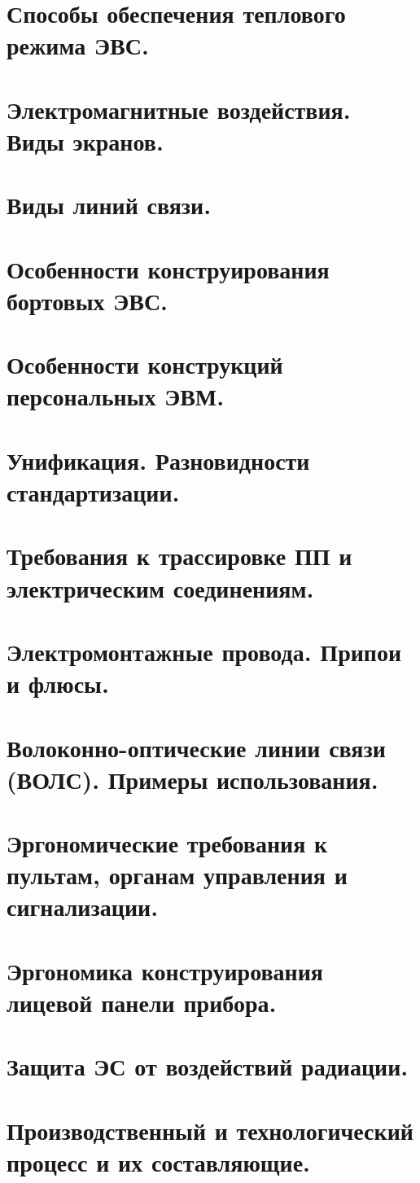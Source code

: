 \documentclass[unicode, 12pt, a4paper, oneside]{article}
\begin{document}
\section{Способы обеспечения теплового режима ЭВС.}
\section{Электромагнитные воздействия. Виды экранов.}
\section{Виды линий связи.}
\section{Особенности конструирования бортовых ЭВС.}
\section{Особенности конструкций персональных ЭВМ.}
\section{Унификация. Разновидности стандартизации.}
\section{Требования к трассировке ПП и электрическим соединениям.}
\section{Электромонтажные провода. Припои и флюсы.}
\section{Волоконно-оптические линии связи (ВОЛС). Примеры использования.}
\section{Эргономические требования к пультам, органам управления и сигнализации.}
\section{Эргономика конструирования лицевой панели прибора.}
\section{Защита ЭС от воздействий радиации.}
\section{Производственный и технологический процесс и их составляющие.}
\end{document}
